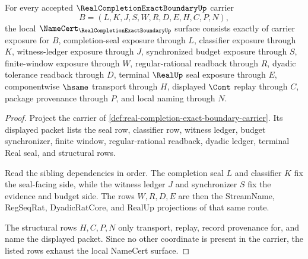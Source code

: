 \begin{theorem}
\label{thm:real-completion-exact-boundary-namecert-obligations}
For every accepted $\RealCompletionExactBoundaryUp$ carrier
$$
B=(L,K,J,S,W,R,D,E,H,C,P,N),
$$
the local $\NameCert_{\RealCompletionExactBoundaryUp}$ surface consists exactly of carrier exposure for $B$, completion-seal exposure through $L$, classifier exposure through $K$, witness-ledger exposure through $J$, synchronized budget exposure through $S$, finite-window exposure through $W$, regular-rational readback through $R$, dyadic tolerance readback through $D$, terminal $\RealUp$ seal exposure through $E$, componentwise $\hsame$ transport through $H$, displayed $\Cont$ replay through $C$, package provenance through $P$, and local naming through $N$.
\end{theorem}
\begin{proof}
Project the carrier of \autoref{def:real-completion-exact-boundary-carrier}. Its displayed packet lists the seal row, classifier row, witness ledger, budget synchronizer, finite window, regular-rational readback, dyadic ledger, terminal Real seal, and structural rows.

Read the sibling dependencies in order. The completion seal $L$ and classifier $K$ fix the seal-facing side, while the witness ledger $J$ and synchronizer $S$ fix the evidence and budget side. The rows $W,R,D,E$ are then the StreamName, RegSeqRat, DyadicRatCore, and RealUp projections of that same route.

The structural rows $H,C,P,N$ only transport, replay, record provenance for, and name the displayed packet. Since no other coordinate is present in the carrier, the listed rows exhaust the local NameCert surface.
\end{proof}

